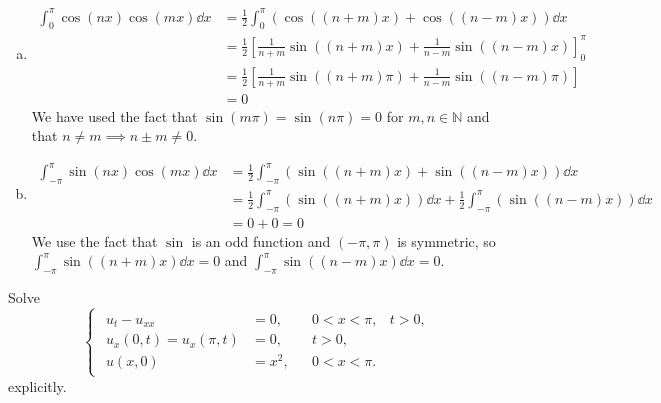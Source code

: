 \documentclass[plain]{pset}
\begin{document}
\begin{solution}
    \[\]
    \vspace{-4em}
    \begin{enumerate}[a.]
        \item
              \begin{align*}
                  \int_0^\pi \cos(nx)\cos(mx) \dd x & = \frac{1}{2}\int_0^\pi \left(\cos((n+m)x) + \cos((n-m)x)\right) \dd x                 \\
                                                    & = \frac{1}{2}\left[\frac{1}{n+m}\sin((n+m)x) + \frac{1}{n-m}\sin((n-m)x) \right]_0^\pi \\
                                                    & = \frac{1}{2}\left[\frac{1}{n+m}\sin((n+m)\pi) + \frac{1}{n-m}\sin((n-m)\pi) \right]   \\
                                                    & = 0
              \end{align*}
              We have used the fact that \(\sin(m\pi) = \sin(n\pi)= 0\) for \(m, n \in \mathbb{N}\) and that \(n \neq m \implies n \pm m \neq 0\).
        \item
              \begin{align*}
                  \int_{-\pi}^\pi \sin(nx)\cos(mx) \dd x & = \frac{1}{2} \int_{-\pi}^\pi \left(\sin((n+m)x) + \sin((n-m)x)\right) \dd x                                                 \\
                                                         & = \frac{1}{2} \int_{-\pi}^\pi \left(\sin((n+m)x) \right) \dd x + \frac{1}{2} \int_{-\pi}^\pi \left(\sin((n-m)x)\right) \dd x \\
                                                         & = 0 + 0 = 0
              \end{align*}
              We use the fact that \(\sin\) is an odd function and \((-\pi, \pi)\) is symmetric, so \(\int_{-\pi}^\pi \sin((n+m)x) \dd x = 0\) and \(\int_{-\pi}^\pi \sin((n-m)x) \dd x = 0\).
    \end{enumerate}
\end{solution}

\pagebreak

\begin{problem}
Solve
\[
    \begin{cases}
        \begin{aligned}
            u_t - u_{xx}            & = 0,   &  & 0 < x < \pi, & t > 0, \\
            u_x(0, t) = u_x(\pi, t) & = 0,   &  & t > 0,                \\
            u(x, 0)                 & = x^2, &  & 0 < x < \pi.
        \end{aligned}
    \end{cases}
\]
explicitly.
\end{problem}
\end{document}
